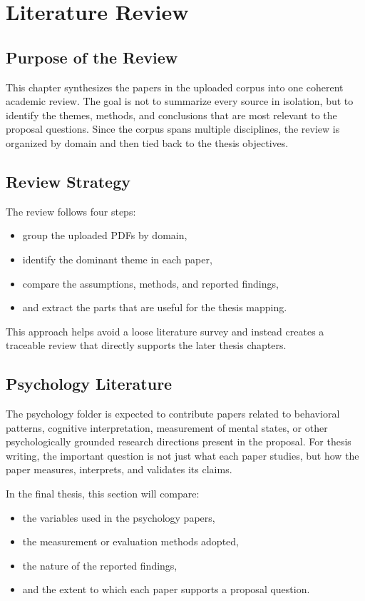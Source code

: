 \documentclass[12pt,a4paper,oneside]{book}
\begin{document}
\chapter{Literature Review}

\section{Purpose of the Review}
This chapter synthesizes the papers in the uploaded corpus into one coherent academic review. The goal is not to summarize every source in isolation, but to identify the themes, methods, and conclusions that are most relevant to the proposal questions. Since the corpus spans multiple disciplines, the review is organized by domain and then tied back to the thesis objectives.

\section{Review Strategy}
The review follows four steps:
\begin{itemize}[leftmargin=*]
  \item group the uploaded PDFs by domain,
  \item identify the dominant theme in each paper,
  \item compare the assumptions, methods, and reported findings,
  \item and extract the parts that are useful for the thesis mapping.
\end{itemize}

This approach helps avoid a loose literature survey and instead creates a traceable review that directly supports the later thesis chapters.

\section{Psychology Literature}
The psychology folder is expected to contribute papers related to behavioral patterns, cognitive interpretation, measurement of mental states, or other psychologically grounded research directions present in the proposal. For thesis writing, the important question is not just what each paper studies, but how the paper measures, interprets, and validates its claims.

In the final thesis, this section will compare:
\begin{itemize}[leftmargin=*]
  \item the variables used in the psychology papers,
  \item the measurement or evaluation methods adopted,
  \item the nature of the reported findings,
  \item and the extent to which each paper supports a proposal question.
\end{itemize}
\end{document}
